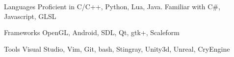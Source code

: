 


\begin{cvskills}


\cvskill
{Languages} %
{Proficient in C/C++, Python, Lua, Java. Familiar with C\#, Javascript, GLSL } %

\cvskill
{Frameworks}
{OpenGL, Android, SDL, Qt, gtk+, Scaleform}

\cvskill
{Tools}
{Visual Studio, Vim, Git, bash, Stingray, Unity3d, Unreal, CryEngine}



\end{cvskills}
